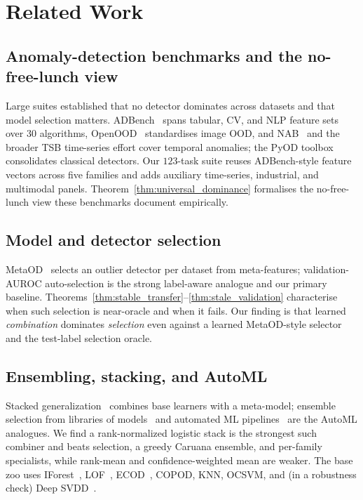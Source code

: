 \documentclass[10pt,conference]{IEEEtran}
\begin{document}
\section{Related Work}

\subsection{Anomaly-detection benchmarks and the no-free-lunch view}
Large suites established that no detector dominates across datasets and that model
selection matters. ADBench~\cite{adbench} spans tabular, CV, and NLP feature sets over
$30$ algorithms, OpenOOD~\cite{openood} standardises image OOD, and NAB~\cite{nab} and
the broader TSB time-series effort cover temporal anomalies; the PyOD
toolbox~\cite{pyod} consolidates classical detectors. Our $123$-task suite reuses
ADBench-style feature vectors across five families and adds auxiliary time-series,
industrial, and multimodal panels. Theorem~\ref{thm:universal_dominance} formalises the
no-free-lunch view these benchmarks document empirically.

\subsection{Model and detector selection}
MetaOD~\cite{metaod} selects an outlier detector per dataset from meta-features;
validation-AUROC auto-selection is the strong label-aware analogue and our primary
baseline. Theorems~\ref{thm:stable_transfer}--\ref{thm:stale_validation} characterise
when such selection is near-oracle and when it fails. Our finding is that learned
\emph{combination} dominates \emph{selection} even against a learned MetaOD-style
selector and the test-label selection oracle.

\subsection{Ensembling, stacking, and AutoML}
Stacked generalization~\cite{wolpert} combines base learners with a meta-model; ensemble
selection from libraries of models~\cite{caruana} and automated ML
pipelines~\cite{autosklearn} are the AutoML analogues. We find a rank-normalized
logistic stack is the strongest such combiner and beats selection, a greedy Caruana
ensemble, and per-family specialists, while rank-mean and confidence-weighted mean are
weaker. The base zoo uses IForest~\cite{iforest}, LOF~\cite{lof}, ECOD~\cite{ecod},
COPOD, KNN, OCSVM, and (in a robustness check) Deep SVDD~\cite{deepsvdd}.
\end{document}
